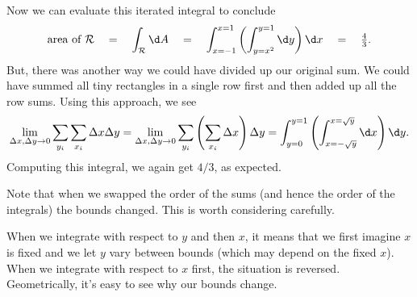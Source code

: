 Now we can evaluate this iterated integral to conclude
\[
	\text{area of }\mathcal R
	\quad
	=\quad
	\int_{\mathcal R}\d A \quad=\quad 
	\int_{x=-1}^{x=1}\left(\int_{y=x^2}^{y=1} \d y\right)\d x \quad=\quad
	\tfrac{4}{3}.
\]
But, there was another way we could have divided up our original sum.  
We could have summed all tiny rectangles in a single row first and then 
added up all the row sums.
Using this approach, we see
\[
	\lim_{\Delta x,\Delta y\to 0} \sum_{y_i}\sum_{x_i} \Delta x\Delta y
	=
	\lim_{\Delta x,\Delta y\to 0} \sum_{y_i}\left(\sum_{x_i} \Delta x\right)\Delta y
	=\int_{y=0}^{y=1}\left(\int_{x=-\sqrt{y}}^{x=\sqrt{y}} \d x\right)\d y.
\]
Computing this integral, we again get $4/3$, as expected.

Note that when we swapped the order of the sums (and hence the order of the integrals)
the bounds changed.  This is worth considering carefully.

When we integrate with respect to $y$ and then $x$, it means that we first imagine
$x$ is fixed and we let $y$ vary between bounds (which may depend on the fixed $x$).
When we integrate with respect to $x$ first, the situation is reversed.  Geometrically,
it's easy to see why our bounds change.


